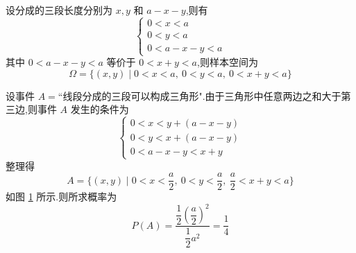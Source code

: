 \begin{solution}
    设分成的三段长度分别为 $x, y$ 和 $a-x-y$,则有
    $$
    \begin{cases}
        0<x<a \\
        0<y<a \\
        0 < a-x-y < a
    \end{cases}
    $$
    其中 $0 < a-x-y < a$ 等价于 $0 < x+y < a$,则样本空间为
    $$
    \varOmega = \{ (x,y) \mid 0<x<a,\ 0<y<a,\ 0 < x+y < a \}
    $$

    设事件 $A = \text{``线段分成的三段可以构成三角形"}$.由于三角形中任意两边之和大于第三边,则事件 $A$ 发生的条件为
    $$
    \begin{cases}
        0 < x < y + (a-x-y) \\
        0 < y < x + (a-x-y) \\
        0 < a-x-y < x+y
    \end{cases}
    $$
    整理得
    $$
    A = \{ (x,y) \mid 0 < x < \dfrac{a}{2},\ 0 < y < \dfrac{a}{2},\ \dfrac{a}{2} < x+y < a \}
    $$
    如图 \ref{fig:example-三角形} 所示.则所求概率为
    $$
    P(A) = \dfrac{\dfrac{1}{2} \left( \dfrac{a}{2} \right)^2}{\dfrac{1}{2} a^2} = \dfrac{1}{4}
    $$

    \begin{figure}[H]
        \centering

        
        \caption{}
        \label{fig:example-三角形}
    \end{figure}
\end{solution}